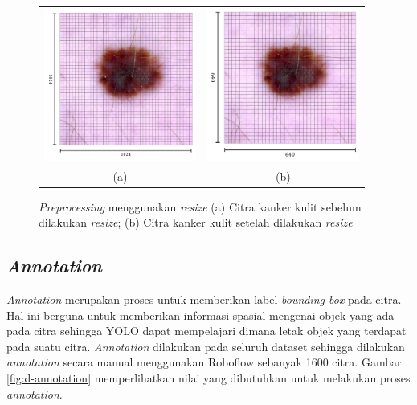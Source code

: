     \begin{figure}[H]
        \centering
        \begin{tabular}{cc}
            \includegraphics[width=5cm]{img/bab4/resize-1024.png}
            &
            \includegraphics[width=5cm]{img/bab4/resize-640.png} \\
            (a)
            &
            (b) \\
        \end{tabular}
        \caption{\textit{Preprocessing} menggunakan \textit{resize} (a) Citra kanker kulit sebelum dilakukan \textit{resize}; (b) Citra kanker kulit setelah dilakukan \textit{resize}}
        \label{fig:d-resized}
    \end{figure}

    

    \subsection{\textit{Annotation}}
    \textit{Annotation} merupakan proses untuk memberikan label \textit{bounding box} pada citra. Hal ini berguna untuk memberikan informasi spasial mengenai objek yang ada pada citra sehingga YOLO dapat mempelajari dimana letak objek yang terdapat pada suatu citra. \textit{Annotation} dilakukan pada seluruh dataset sehingga dilakukan \textit{annotation} secara manual menggunakan Roboflow sebanyak 1600 citra. Gambar \ref{fig:d-annotation} memperlihatkan nilai yang dibutuhkan untuk melakukan proses \textit{annotation}.

